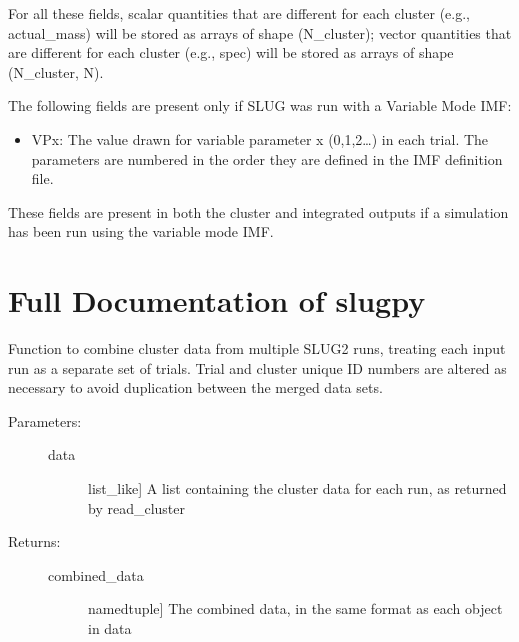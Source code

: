 \documentclass[letterpaper,10pt,english]{sphinxmanual}
\begin{document}
For all these fields, scalar quantities that are different for each cluster (e.g., actual\_mass) will be stored as arrays of shape (N\_cluster); vector quantities that are different for each cluster (e.g., spec) will be stored as arrays of shape (N\_cluster, N).

The following fields are present only if SLUG was run with a Variable Mode IMF:
\begin{itemize}
\item {} 
VPx: The value drawn for variable parameter x (0,1,2…) in each trial. The parameters are numbered in the order they are defined in the IMF definition file.

\end{itemize}

These fields are present in both the cluster and integrated outputs if a simulation has been run using the variable mode IMF.


\section{Full Documentation of slugpy}
\label{\detokenize{slugpy:module-slugpy}}\label{\detokenize{slugpy:full-documentation-of-slugpy}}

\begin{fulllineitems}
\label{\detokenize{slugpy:slugpy.combine_cluster}}
Function to combine cluster data from multiple SLUG2 runs,
treating each input run as a separate set of trials. Trial and
cluster unique ID numbers are altered as necessary to avoid
duplication between the merged data sets.
\begin{description}
\item[{Parameters:}] \leavevmode\begin{description}
\item[{data}] \leavevmode{[}list\_like{]}
A list containing the cluster data for each run, as
returned by read\_cluster

\end{description}

\item[{Returns:}] \leavevmode\begin{description}
\item[{combined\_data}] \leavevmode{[}namedtuple{]}
The combined data, in the same format as each object in data

\end{description}

\end{description}

\end{fulllineitems}
\end{document}
